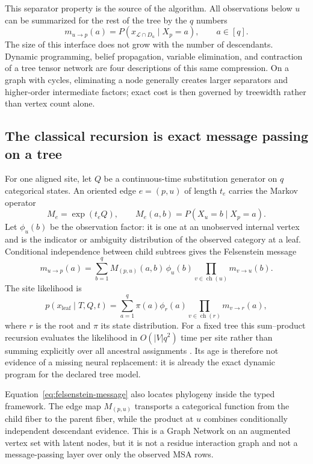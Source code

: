 \documentclass[10pt]{article}
\theoremstyle{definition}
\theoremstyle{remark}
\newcommand{\BookSection}[1]{\subsection{#1}}
\begin{document}
This separator property is the source of the algorithm.  All observations below $u$ can be
summarized for the rest of the tree by the $q$ numbers
\begin{equation}
m_{u\to p}(a)
=P\!\left(
x_{\mathcal L\cap D_u}\mid X_p=a
\right),
\qquad a\in[q].
\label{eq:phylo-subtree-message}
\end{equation}
The size of this interface does not grow with the number of descendants.  Dynamic programming,
belief propagation, variable elimination, and contraction of a tree tensor network are four
descriptions of this same compression.  On a graph with cycles, eliminating a node generally
creates larger separators and higher-order intermediate factors; exact cost is then governed by
treewidth rather than vertex count alone.

\BookSection{The classical recursion is exact message passing on a tree}

For one aligned site, let $Q$ be a continuous-time substitution generator on $q$ categorical
states.  An oriented edge $e=(p,u)$ of length $t_e$ carries the Markov operator
\begin{equation}
M_e=\exp(t_eQ),
\qquad
M_e(a,b)=P(X_u=b\mid X_p=a).
\label{eq:phylo-edge-kernel}
\end{equation}
Let $\phi_u(b)$ be the observation factor: it is one at an unobserved internal vertex and is the
indicator or ambiguity distribution of the observed category at a leaf.  Conditional independence
between child subtrees gives the Felsenstein message
\begin{equation}
m_{u\to p}(a)
=\sum_{b=1}^{q}
M_{(p,u)}(a,b)\,
\phi_u(b)
\prod_{v\in\operatorname{ch}(u)}m_{v\to u}(b).
\label{eq:felsenstein-message}
\end{equation}
The site likelihood is
\begin{equation}
p(x_{\mathrm{leaf}}\mid T,Q,t)
=\sum_{a=1}^{q}\pi(a)
\phi_r(a)
\prod_{v\in\operatorname{ch}(r)}
m_{v\to r}(a),
\label{eq:phylo-site-likelihood}
\end{equation}
where $r$ is the root and $\pi$ its state distribution.  For a fixed tree this sum--product
recursion evaluates the likelihood in $O(|V|q^2)$ time per site rather than summing explicitly over
all ancestral assignments \cite{felsenstein1981}.  Its age is therefore not evidence of a missing
neural replacement: it is already the exact dynamic program for the declared tree model.

Equation~\ref{eq:felsenstein-message} also locates phylogeny inside the typed framework.  The edge
map $M_{(p,u)}$ transports a categorical function from the child fiber to the parent fiber, while
the product at $u$ combines conditionally independent descendant evidence.  This is a Graph
Network on an augmented vertex set with latent nodes, but it is not a residue interaction graph
and not a message-passing layer over only the observed MSA rows.
\end{document}
